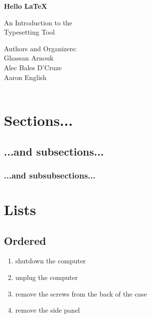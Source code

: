 \documentclass[titlepage, hidelinks, 12pt]{article}%
\begin{document}
    \begin{titlepage}
        \begin{center}
            \vspace*{1cm}
            \Huge
            \textbf{Hello \LaTeX}

            \vspace{0.5cm}
            \LARGE
            An Introduction to the\\
            Typesetting Tool
            \vfill
        \end{center}
        \begin{flushright}
            Authors and Organizers:\\
            Ghassan Arnouk\\
            Alec Bales D'Cruze\\
            Aaron English\\
            \\
        \end{flushright}
    \end{titlepage}

    \tableofcontents
    \clearpage
    \listoffigures
    \clearpage
    
    \section{Sections...}
        \subsection{...and subsections...}
            \subsubsection{...and subsubsections...}


    \section{Lists}
        \subsection{Ordered}
            \begin{enumerate}
                \item shutdown the computer
                \item unplug the computer
                \item remove the screws from the back of the case
                \item remove the side panel
            \end{enumerate}
\end{document}
